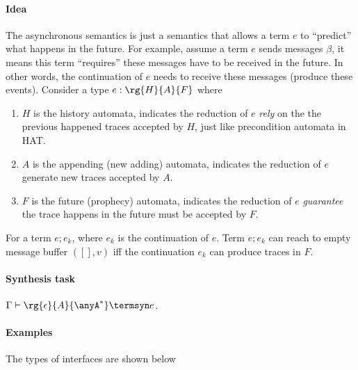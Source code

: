\paragraph{Idea} The asynchronous semantics is just a semantics that allows a term $e$ to ``predict'' what happens in the future. For example, assume a term $e$ sends messages $\beta$, it means this term ``requires'' these messages have to be received in the future. In other words, the continuation of $e$ needs to receive these messages (produce these events).
Consider a type $e : \rg{H}{A}{F}$ where 
\begin{enumerate}
    \item $H$ is the history automata, indicates the reduction of $e$ \emph{rely} on the the previous happened traces accepted by $H$, just like precondition automata in HAT.
    \item $A$ is the appending (new adding) automata, indicates the reduction of $e$ generate new traces accepted by $A$.
    \item $F$ is the future (prophecy) automata, indicates the reduction of $e$ \emph{guarantee} the trace happens in the future must be accepted by $F$.
\end{enumerate}
For a term $e;e_k$, where $e_k$ is the continuation of $e$. Term $e;e_k$ can reach to empty message buffer $([], v)$ iff the continuation $e_k$ can produce traces in $F$.

\paragraph{Synthesis task} $\Gamma \vdash \rg{\epsilon}{A}{\anyA^*} \termsyn e$.

\paragraph{Examples} The types of interfaces are shown below


